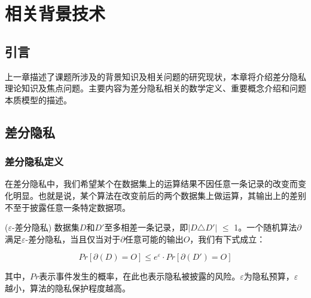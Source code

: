 


\chapter{相关背景技术}
\label{chap:background}

\section{引言}

上一章描述了课题所涉及的背景知识及相关问题的研究现状，本章将介绍差分隐私理论知识及焦点问题。主要内容为差分隐私相关的数学定义、重要概念介绍和问题本质模型的描述。

\section{差分隐私}

\subsection{差分隐私定义}

在差分隐私中，我们希望某个在数据集上的运算结果不因任意一条记录的改变而变化明显。也就是说，某个算法在改变前后的两个数据集上做运算，其输出上的差别不至于披露任意一条特定数据项。

\begin{defn}
	
($\varepsilon$\textsc{-差分隐私})\supercite{Dwork Calibrating} 数据集$D$和$D'$至多相差一条记录，即$|D$$\triangle$$D'|$ $\leqslant$ 1。一个随机算法$\partial$满足$\varepsilon$-差分隐私，当且仅当对于$\partial$任意可能的输出$O$，我们有下式成立：

\begin{equation}
  \label{eq:res1}
	 Pr[\partial(D) = O] \leqslant e^{\varepsilon} \cdot Pr[\partial(D') = O]
\end{equation}


其中，$Pr$表示事件发生的概率，在此也表示隐私被披露的风险。$\varepsilon$为隐私预算，$\varepsilon$越小，算法的隐私保护程度越高。

\end{defn}

